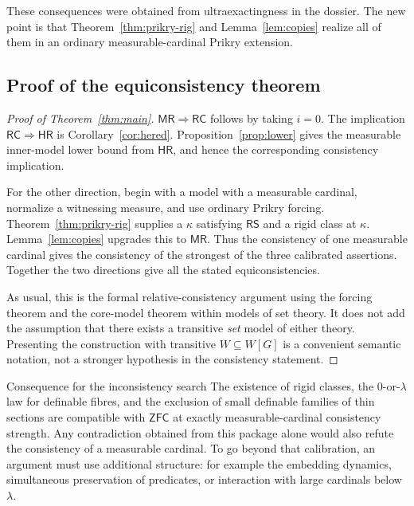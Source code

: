 \documentclass[11pt,letterpaper]{article}
\theoremstyle{definition}
\numberwithin{equation}{section}
\newcommand{\ZFC}{\mathsf{ZFC}}
\newcommand{\RS}{\mathsf{RS}}
\newcommand{\RC}{\mathsf{RC}}
\newcommand{\MR}{\mathsf{MR}}
\newcommand{\HR}{\mathsf{HR}}
\begin{document}
These consequences were obtained from ultraexactingness in the dossier.
The new point is that Theorem~\ref{thm:prikry-rig} and
Lemma~\ref{lem:copies} realize all of them in an ordinary measurable-cardinal
Prikry extension.

\subsection{Proof of the equiconsistency theorem}

\begin{proof}[Proof of Theorem~\ref{thm:main}]
$\MR\Rightarrow\RC$ follows by taking $i=0$. The implication
$\RC\Rightarrow\HR$ is Corollary~\ref{cor:hered}.
Proposition~\ref{prop:lower} gives the measurable inner-model lower bound
from $\HR$, and hence the corresponding consistency implication.

For the other direction, begin with a model with a measurable cardinal,
normalize a witnessing measure, and use ordinary Prikry forcing.
Theorem~\ref{thm:prikry-rig} supplies a $\kappa$ satisfying $\RS$ and a
rigid class at $\kappa$. Lemma~\ref{lem:copies} upgrades this to $\MR$.
Thus the consistency of one measurable cardinal gives the consistency of
the strongest of the three calibrated assertions. Together the two
directions give all the stated equiconsistencies.

As usual, this is the formal relative-consistency argument using the
forcing theorem and the core-model theorem within models of set theory.
It does not add the assumption that there exists a transitive \emph{set}
model of either theory. Presenting the construction with transitive
$W\subseteq W[G]$ is a convenient semantic notation, not a stronger
hypothesis in the consistency statement.
\end{proof}

\begin{assessment}{Consequence for the inconsistency search}
The existence of rigid classes, the $0$-or-$\lambda$ law for definable
fibres, and the exclusion of small definable families of thin sections
are compatible with $\ZFC$ at exactly measurable-cardinal consistency
strength. Any contradiction obtained from this package alone would also refute the
consistency of a measurable cardinal. To go beyond that calibration, an
argument must use additional structure: for example the embedding dynamics, simultaneous preservation
of predicates, or interaction with large cardinals below $\lambda$.
\end{assessment}
\end{document}
